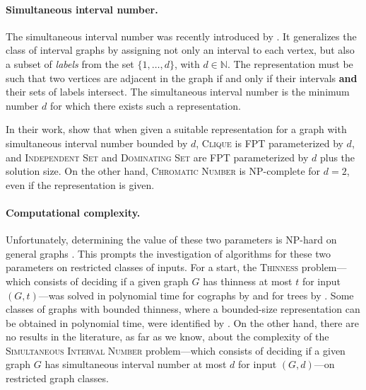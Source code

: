 \documentclass[11pt]{article}
\theoremstyle{plain}
\theoremstyle{definition}
\theoremstyle{remark}
\newcommand{\N}{\mathbb{N}}
\newcommand{\FPT}{{\smaller[0.83]\textsf{\textup{FPT}}}\xspace}
\newcommand{\NP}{{\smaller[0.83]\textsf{\textup{NP}}}}
\begin{document}
\paragraph{Simultaneous interval number.} The simultaneous interval number was recently introduced by \citet{Milanic-sim}. It generalizes the class of interval graphs by assigning not only an interval to each vertex, but also a subset of \emph{labels} from the set $\{1,\dots,d\}$, with $d\in \N$. The representation must be such that two vertices are adjacent in the graph if and only if their intervals \textbf{and} their sets of labels intersect. The simultaneous interval number is the minimum number $d$ for which there exists such a representation.

In their work, \citet{Milanic-sim} show that when given a suitable representation for a graph with simultaneous interval number bounded by $d$, \textsc{Clique} is \FPT parameterized by $d$, and \textsc{Independent Set} and \textsc{Dominating Set} are \FPT parameterized by $d$ plus the solution size. On the other hand, \textsc{Chromatic Number} is \NP-complete for $d=2$, even if the representation is given.

\paragraph{Computational complexity.}
Unfortunately, determining the value of these two parameters is \NP-hard on general graphs \citep{Milanic-sim, thinness-np-complete}. This prompts the investigation of algorithms for these two parameters on restricted classes of inputs. For a start, the \textsc{Thinness} problem---which consists of deciding if a given graph $G$ has thinness at most $t$ for input $(G, t)$---was solved in polynomial time for cographs by \citet{tesis-diego} and for trees by \citet{thinness-of-trees}. Some classes of graphs with bounded thinness, where a bounded-size representation can be obtained in polynomial time, were identified by \citet{B-B-M-P-convex-jcss}. On the other hand, there are no results in the literature, as far as we know, about the complexity of the \textsc{Simultaneous Interval Number} problem---which consists of deciding if a given graph $G$ has simultaneous interval number at most $d$ for input $(G,d)$---on restricted graph classes. 
\end{document}
